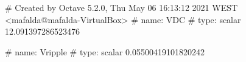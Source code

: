 # Created by Octave 5.2.0, Thu May 06 16:13:12 2021 WEST <mafalda@mafalda-VirtualBox>
# name: VDC
# type: scalar
12.091397286523476


# name: Vripple
# type: scalar
0.05500419101820242


